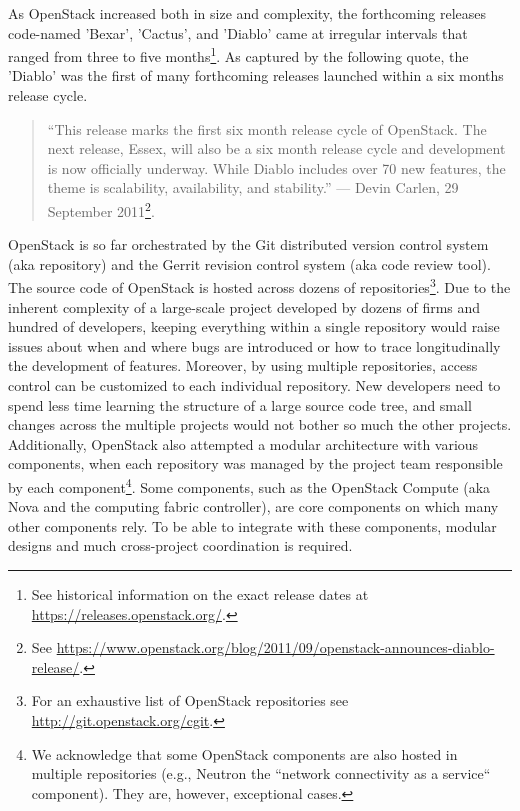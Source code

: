 \documentclass[dvipsnames]{interact}
\theoremstyle{plain}\newtheorem{theorem}{Theorem}[section]
\theoremstyle{definition}
\theoremstyle{remark}
\begin{document}
As OpenStack increased both  in size and  complexity, the forthcoming releases code-named 'Bexar', 'Cactus', and 'Diablo' came at irregular intervals that ranged from three to five months\footnote{See historical information on the exact release dates at \url{https://releases.openstack.org/}.}. As captured by the following quote, the  'Diablo' was the first of many forthcoming releases launched within a six months release cycle. 

\begin{quotation}
\footnotesize
``This release marks the first six month release cycle of OpenStack.  The next release, Essex, will also be a six month release cycle and development is now officially underway. While Diablo includes over 70 new features, the theme is scalability, availability, and stability.''  --- Devin Carlen, 29 September 2011\footnote{See \url{https://www.openstack.org/blog/2011/09/openstack-announces-diablo-release/}.}.
\end{quotation}



OpenStack is so far orchestrated by the Git distributed version control system (aka repository) and the Gerrit revision control system (aka code review tool). 
The source code of OpenStack is hosted across dozens of repositories\footnote{For an exhaustive list of OpenStack repositories see \url{http://git.openstack.org/cgit}.}. Due to the inherent complexity of a large-scale project developed by dozens of firms and hundred of developers,  keeping everything within a single repository would raise issues about when and where bugs are introduced  or how to trace longitudinally the development of features. Moreover, by using multiple repositories, access control can be customized to each individual repository. New developers need to spend less time learning the structure of a large source code tree, and small changes across the multiple projects would not bother so much the other projects. Additionally,  OpenStack also attempted a modular architecture with various components, when each repository was managed by the project team responsible by each component\footnote{We acknowledge that some OpenStack components are also hosted in multiple repositories (e.g., Neutron the  “network connectivity as a service`` component). They are, however, exceptional cases.}. Some components, such as the OpenStack Compute (aka Nova and the computing fabric controller), are core components on which many other components rely. To be able to integrate with these components, modular designs and much cross-project coordination is required.
\end{document}

